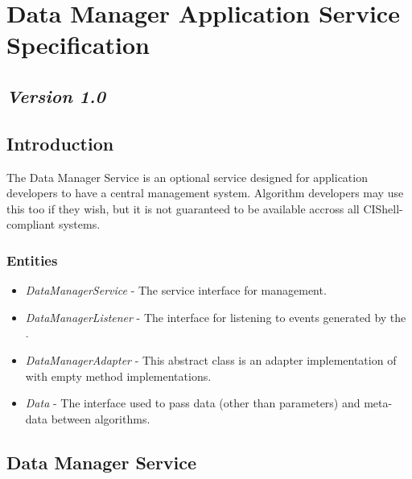 \chapter{Data Manager Application Service Specification}

\section*{\textit{Version 1.0}}

\section{Introduction}

The Data Manager Service is an optional service designed for application
developers to have a central  management system. Algorithm
developers may use this too if they wish, but it is not guaranteed to be
available accross all CIShell-compliant systems.

\subsection{Entities}

\begin{itemize}
  \item \textit{DataManagerService} - The service interface for 
  management.
  \item \textit{DataManagerListener} - The interface for listening to events
  generated by the .
  \item \textit{DataManagerAdapter} - This abstract class is an adapter
  implementation of  with empty method
  implementations.
  \item \textit{Data} - The interface used to pass data (other than
  parameters) and meta-data between algorithms.
\end{itemize}

\section{Data Manager Service}


\orgcishellappservicedatamanager{}